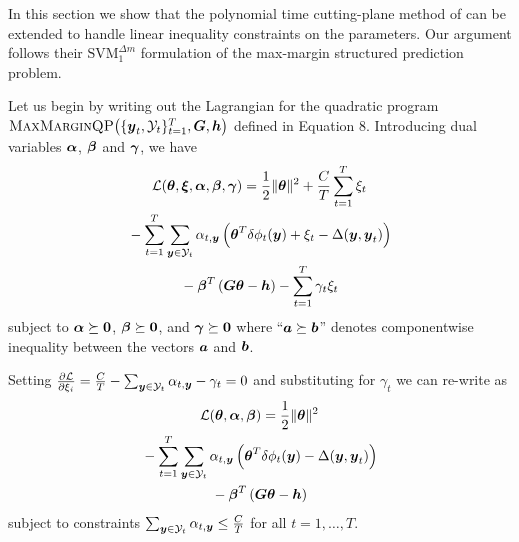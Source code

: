 \documentclass[10pt,journal,letterpaper,compsoc]{IEEEtran}
\renewcommand{\citename}{\citet}
\newcommand{\mmqp}[3]{\textrm{\sc MaxMarginQP}\!\left(\{\by_t, #1\}_{t=1}^{T}, #2, #3\right)}
\begin{document}
\clearpage
\appendix

In this section we show that the polynomial time cutting-plane method
of \citename{Tsochantaridis:JMLR05} can be extended to handle linear
inequality constraints on the parameters. Our argument follows their
$\text{SVM}_1^{\Delta m}$ formulation of the max-margin structured
prediction problem.

Let us begin by writing out the Lagrangian for the quadratic program
$\mmqp{\Y_t}{\bG}{\bh}$  defined in Equation 8.
Introducing dual variables $\boldsymbol{\alpha}$, $\boldsymbol{\beta}$ and $\boldsymbol{\gamma}$, we have
%
\begin{multline}
  \Ell(\btheta, \bxi, \balpha, \bbeta, \bgamma) =
  \frac{1}{2} \|\btheta\|^2 + \frac{C}{T} \sum_{t=1}^{T} \xi_t\\
  {}- \sum_{t=1}^{T} \sum_{\by \in \Y_t} \alpha_{t, \by} \left(\btheta^T \delta\phi_t(\by) + \xi_t - \Delta(\by, \by_t)\right)\\
  {}- \bbeta^T \left( \bG \btheta - \bh\right) - \sum_{t=1}^T \gamma_t \xi_t
  \label{eqn:lagrangian}
\end{multline}
%
subject to $\boldsymbol{\alpha} \succeq \textbf{0}$, $\boldsymbol{\beta} \succeq \textbf{0}$, and
$\boldsymbol{\gamma} \succeq \textbf{0}$ where ``$\boldsymbol{a} \succeq \boldsymbol{b}$'' denotes
componentwise inequality between the vectors $\boldsymbol{a}$ and $\boldsymbol{b}$.

Setting $\frac{\partial \Ell}{\partial \xi_i} = \frac{C}{T} -
\sum_{\by \in \Y_t} \alpha_{t,\by} - \gamma_t = 0$ and substituting
for $\gamma_t$ we can re-write  as
%
\begin{multline}
  \Ell(\btheta, \balpha, \bbeta) =
  \frac{1}{2} \|\btheta\|^2 \\
  {}- \sum_{t=1}^{T} \sum_{\by \in \Y_t} \alpha_{t, \by} \left(\btheta^T \delta\phi_t(\by) - \Delta(\by, \by_t)\right)\\
  {}- \bbeta^T \left( \bG \btheta - \bh\right)
  \label{eqn:lagrangian2}
\end{multline}
%
subject to constraints $\sum_{\by \in \Y_t} \alpha_{t,\by} \leq
\frac{C}{T}$ for all $t = 1, \ldots, T$.
\end{document}
